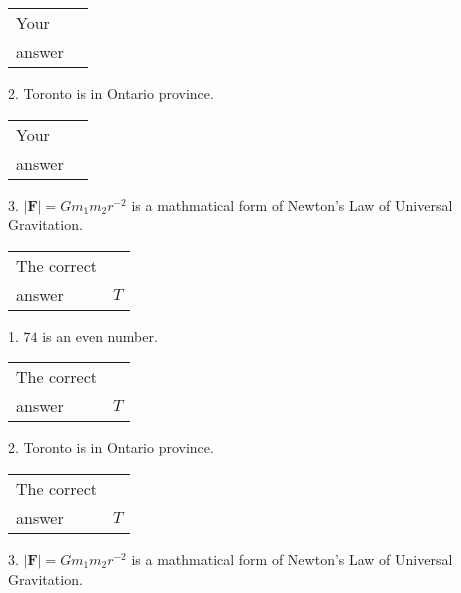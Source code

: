 \documentclass[12pt]{article}
\begin{document}
\noindent\begin{tabular}{|l|l|}\hline Your&\hspace{.2in} \\ answer&\hspace{.2in} \\ \hline \end{tabular}
2.  %
Toronto is in  %
Ontario province.
 
\noindent\begin{tabular}{|l|l|}\hline Your&\hspace{.2in} \\ answer&\hspace{.2in} \\ \hline \end{tabular}
3.  %
$\left| \mathbf{F}\right| =Gm_1m_2r^{-2}$ is a mathmatical form of
Newton's Law of Universal Gravitation.
 
 
 
\noindent{}
 
 

 
\noindent\begin{tabular}{|l|l|}\hline The correct & \\
          answer &  %
$T$ \\ \hline \end{tabular}
1. $ %
74$ is an  %
even number.
 
\noindent\begin{tabular}{|l|l|}\hline The correct & \\
          answer &  %
$T$ \\ \hline \end{tabular}
2.  %
Toronto is in  %
Ontario province.
 
\noindent\begin{tabular}{|l|l|}\hline The correct & \\
          answer &  %
$T$ \\ \hline \end{tabular}
3.  %
$\left| \mathbf{F}\right| =Gm_1m_2r^{-2}$ is a mathmatical form of  %
Newton's Law of Universal Gravitation.
 
 
 
\noindent{}
 
 

 
\vspace{0.3in}
   
   
   
\end{document}

